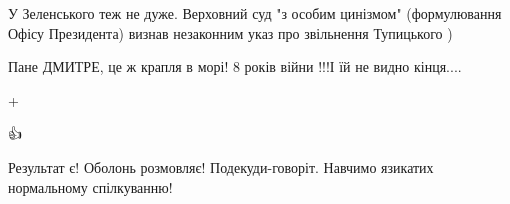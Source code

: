 \begin{itemize}
 
У Зеленського теж не дуже. Верховний суд "з особим цинізмом" (формулювання
Офісу Президента) визнав незаконним указ про звільнення Тупицького )

 
Пане ДМИТРЕ, це ж крапля в морі! 8 років війни !!!І їй не видно кінця....

 
+

 
👍👏✊

 
Результат є! Оболонь розмовляє! Подекуди-говоріт. Навчимо язикатих нормальному спілкуванню!
\end{itemize}

